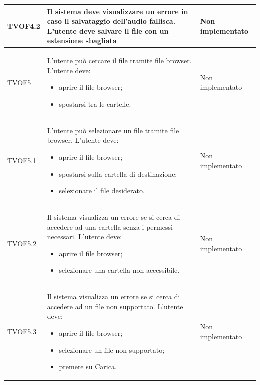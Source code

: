 \documentclass[openany,12pt,a4paper]{report}
\begin{document}
\begin{longtable}{| p{3cm} |p{8cm} | p{2.5cm} |}
	\hline
	\newline TVOF4.2&
	\newline Il sistema deve visualizzare un errore in caso il salvataggio dell'audio fallisca. L'utente deve salvare il file con un estensione sbagliata&
	\newline Non implementato
	\\[1em]
	\hline
	
	\newline TVOF5&
	\newline L'utente può cercare il file tramite file browser. L'utente deve:
	\begin{itemize}
		\item aprire il file browser;
		\item spostarsi tra le cartelle.
	\end{itemize}&
	\newline Non implementato
	\\[1em]
	\hline
	
	\newline TVOF5.1&
	\newline L'utente può selezionare un file tramite file browser. L'utente deve:
	\begin{itemize}
		\item aprire il file browser;
		\item spostarsi sulla cartella di destinazione;
		\item selezionare il file desiderato.
	\end{itemize}&
	\newline Non implementato
	\\[1em]	
	\hline
	
	\newline TVOF5.2&
	\newline Il sistema visualizza un errore se si cerca di accedere ad una cartella senza i permessi necessari. L'utente deve:
	\begin{itemize}
		\item aprire il file browser;
		\item selezionare una cartella non accessibile.
	\end{itemize}&
	\newline Non implementato
	\\[1em]	
	\hline
	
	\newline TVOF5.3&
	\newline Il sistema visualizza un errore se si cerca di accedere ad un file non supportato. L'utente deve:
	\begin{itemize}
		\item aprire il file browser;
		\item selezionare un file non supportato;
		\item premere su Carica.
	\end{itemize}&
	\newline Non implementato
	\\[1em]	
	\hline
	

\end{longtable}
\end{document}
